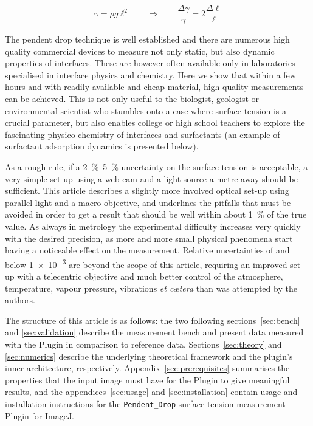 \documentclass[fleqn]{scrartcl}
\newcommand{\gouttependante}{\texttt{Pendent\_Drop}\xspace}
\begin{document}
\[
\gamma = \rho g \ell^2 \qquad \Rightarrow \qquad
\frac{\Delta\gamma}{\gamma} = 2 \frac{\Delta\ell}{\ell}
\]

The pendent drop technique is well established and there are numerous
high quality commercial devices to measure not only static, but also
dynamic properties of interfaces. These are however often available
only in laboratories specialised in interface physics and chemistry.
Here we show that within a few hours and with readily available and
cheap material, high quality measurements can be achieved. This is not
only useful to the biologist, geologist or environmental scientist who
stumbles onto a case where surface tension is a crucial parameter, but
also enables college or high school teachers to explore the
fascinating physico-chemistry of interfaces and surfactants (an
example of surfactant adsorption dynamics is presented below).

As a rough rule, if a \SIrange{2}{5}{\percent} uncertainty on the
surface tension is acceptable, a very simple set-up using a web-cam
and a light source a metre away should be sufficient. This article
describes a slightly more involved optical set-up using parallel light
and a macro objective, and underlines the pitfalls that must be
avoided in order to get a result that should be well within about
\SI{1}{\percent} of the true value. As always in metrology the
experimental difficulty increases very quickly with the desired
precision, as more and more small physical phenomena start having a
noticeable effect on the measurement. Relative uncertainties of and
below \num{1e-3} are beyond the scope of this article, requiring an
improved set-up with a telecentric objective and much better control
of the atmosphere, temperature, vapour pressure, vibrations \textit{et
  c{\ae}tera} than was attempted by the authors.

The structure of this article is as follows: the two following
sections~\ref{sec:bench} and \ref{sec:validation} describe the
measurement bench and present data measured with the Plugin in
comparison to reference data. Sections~\ref{sec:theory} and
\ref{sec:numerics} describe the underlying theoretical framework and
the plugin's inner architecture, respectively.
Appendix~\ref{sec:prerequisites} summarises the properties that the
input image must have for the Plugin to give meaningful results, and
the appendices~\ref{sec:usage} and \ref{sec:installation} contain
usage and installation instructions for the \gouttependante surface
tension measurement Plugin for ImageJ.
\end{document}
